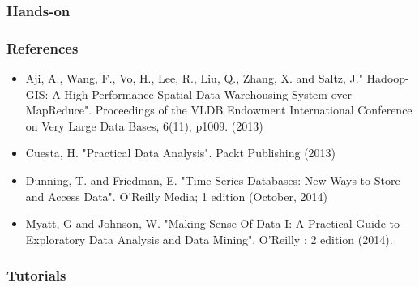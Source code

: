 \documentclass[hyperref={pdfpagelabels=true}]{beamer}
\begin{document}
\begin{frame}
\frametitle{Hands-on}


\end{frame}






\begin{frame}
\frametitle{References}
\begin{itemize}
\item Aji, A., Wang, F., Vo, H., Lee, R., Liu, Q., Zhang, X. and Saltz, J." Hadoop-GIS: A High Performance Spatial Data Warehousing System over MapReduce". Proceedings of the VLDB Endowment International Conference on Very Large Data Bases, 6(11), p1009. (2013)
\item Cuesta, H. "Practical Data Analysis". Packt Publishing (2013)
\item Dunning, T. and Friedman, E. "Time Series Databases: New Ways to Store and Access Data". O'Reilly Media; 1 edition (October, 2014)
\item Myatt, G and Johnson, W. "Making Sense Of Data I: A Practical Guide to Exploratory Data Analysis and Data Mining". O'Reilly : 2 edition (2014).

\end{itemize}
\end{frame}

\begin{frame}
\frametitle{Tutorials}
\end{frame}
\end{document}
